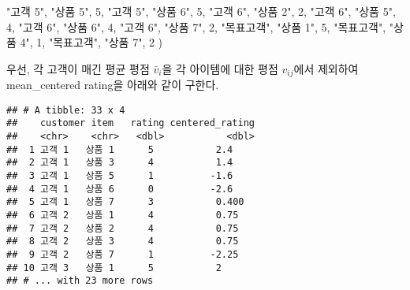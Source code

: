 \documentclass[]{book}
\newenvironment{Shaded}{\begin{snugshade}}{\end{snugshade}}
\newcommand{\DataTypeTok}[1]{\textcolor[rgb]{0.13,0.29,0.53}{#1}}
\newcommand{\DecValTok}[1]{\textcolor[rgb]{0.00,0.00,0.81}{#1}}
\newcommand{\KeywordTok}[1]{\textcolor[rgb]{0.13,0.29,0.53}{\textbf{#1}}}
\newcommand{\NormalTok}[1]{#1}
\newcommand{\OperatorTok}[1]{\textcolor[rgb]{0.81,0.36,0.00}{\textbf{#1}}}
\newcommand{\StringTok}[1]{\textcolor[rgb]{0.31,0.60,0.02}{#1}}
\begin{document}
\begin{Shaded}
\begin{Highlighting}[]
  \StringTok{"고객 5"}\NormalTok{, }\StringTok{"상품 5"}\NormalTok{, }\DecValTok{5}\NormalTok{,}
  \StringTok{"고객 5"}\NormalTok{, }\StringTok{"상품 6"}\NormalTok{, }\DecValTok{5}\NormalTok{,}
  \StringTok{"고객 6"}\NormalTok{, }\StringTok{"상품 2"}\NormalTok{, }\DecValTok{2}\NormalTok{,}
  \StringTok{"고객 6"}\NormalTok{, }\StringTok{"상품 5"}\NormalTok{, }\DecValTok{4}\NormalTok{,}
  \StringTok{"고객 6"}\NormalTok{, }\StringTok{"상품 6"}\NormalTok{, }\DecValTok{4}\NormalTok{,}
  \StringTok{"고객 6"}\NormalTok{, }\StringTok{"상품 7"}\NormalTok{, }\DecValTok{2}\NormalTok{,}
  \StringTok{"목표고객"}\NormalTok{, }\StringTok{"상품 1"}\NormalTok{, }\DecValTok{5}\NormalTok{,}
  \StringTok{"목표고객"}\NormalTok{, }\StringTok{"상품 4"}\NormalTok{, }\DecValTok{1}\NormalTok{,}
  \StringTok{"목표고객"}\NormalTok{, }\StringTok{"상품 7"}\NormalTok{, }\DecValTok{2}
\NormalTok{)}
\end{Highlighting}
\end{Shaded}

우선, 각 고객이 매긴 평균 평점 \(\bar{v}_i\)을 각 아이템에 대한 평점 \(v_{ij}\)에서 제외하여 mean\_centered rating을 아래와 같이 구한다.

\begin{Shaded}
\end{Shaded}

\begin{verbatim}
## # A tibble: 33 x 4
##    customer item   rating centered_rating
##    <chr>    <chr>   <dbl>           <dbl>
##  1 고객 1   상품 1      5           2.4  
##  2 고객 1   상품 3      4           1.4  
##  3 고객 1   상품 5      1          -1.6  
##  4 고객 1   상품 6      0          -2.6  
##  5 고객 1   상품 7      3           0.400
##  6 고객 2   상품 1      4           0.75 
##  7 고객 2   상품 2      4           0.75 
##  8 고객 2   상품 3      4           0.75 
##  9 고객 2   상품 7      1          -2.25 
## 10 고객 3   상품 1      5           2    
## # ... with 23 more rows
\end{verbatim}
\end{document}
